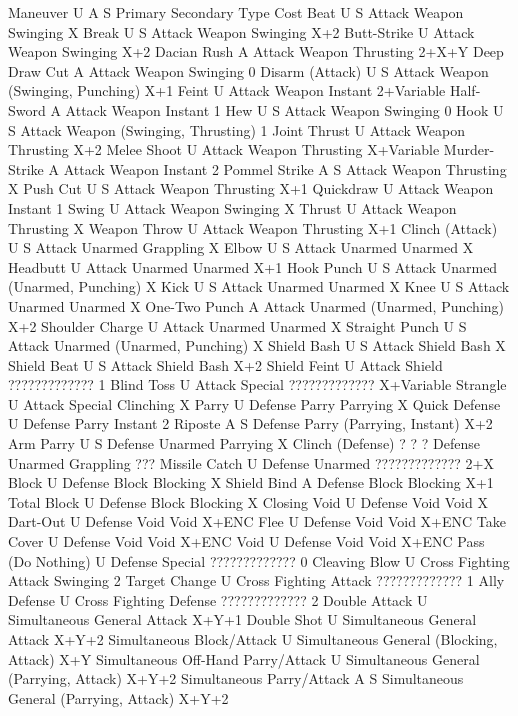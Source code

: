 \documentclass[oneside,11pt,english]{book}
\begin{document}
 

Maneuver U A S Primary Secondary Type Cost 
Beat U S Attack Weapon Swinging X 
Break U S Attack Weapon Swinging X+2 
Butt-Strike U Attack Weapon Swinging X+2 
Dacian Rush A Attack Weapon Thrusting 2+X+Y 
Deep Draw Cut A Attack Weapon Swinging 0 
Disarm (Attack) U S Attack Weapon (Swinging, Punching) X+1 
Feint U Attack Weapon Instant 2+Variable
Half-Sword A Attack Weapon Instant 1
Hew U S Attack Weapon Swinging 0 
Hook U S Attack Weapon (Swinging, Thrusting) 1
Joint Thrust U Attack Weapon Thrusting X+2
Melee Shoot U Attack Weapon Thrusting X+Variable
Murder-Strike A Attack Weapon Instant 2
Pommel Strike A S Attack Weapon Thrusting X 
Push Cut U S Attack Weapon Thrusting X+1 
Quickdraw U Attack Weapon Instant 1 
Swing U Attack Weapon Swinging X 
Thrust U Attack Weapon Thrusting X 
Weapon Throw U Attack Weapon Thrusting X+1 
Clinch (Attack) U S Attack Unarmed Grappling X 
Elbow U S Attack Unarmed Unarmed X 
Headbutt U Attack Unarmed Unarmed X+1 
Hook Punch U S Attack Unarmed (Unarmed, Punching) X
Kick U S Attack Unarmed Unarmed X 
Knee U S Attack Unarmed Unarmed X 
One-Two Punch A Attack Unarmed (Unarmed, Punching) X+2 
Shoulder Charge U Attack Unarmed Unarmed X 
Straight Punch U S Attack Unarmed (Unarmed, Punching) X
Shield Bash U S Attack Shield Bash X 
Shield Beat U S Attack Shield Bash X+2 
Shield Feint U Attack Shield ????????????? 1 
Blind Toss U Attack Special ????????????? X+Variable 
Strangle U Attack Special Clinching X 
Parry U Defense Parry Parrying X 
Quick Defense U Defense Parry Instant 2 
Riposte A S Defense Parry (Parrying, Instant) X+2 
Arm Parry U S Defense Unarmed Parrying X
Clinch (Defense) ? ? ? Defense Unarmed Grappling ???
Missile Catch U Defense Unarmed ????????????? 2+X 
Block U Defense Block Blocking X 
Shield Bind A Defense Block Blocking X+1 
Total Block U Defense Block Blocking X 
Closing Void U Defense Void Void X 
Dart-Out U Defense Void Void X+ENC 
Flee U Defense Void Void X+ENC 
Take Cover U Defense Void Void X+ENC 
Void U Defense Void Void X+ENC 
Pass (Do Nothing) U Defense Special ????????????? 0 
Cleaving Blow U Cross Fighting Attack Swinging 2 
Target Change U Cross Fighting Attack ????????????? 1 
Ally Defense U Cross Fighting Defense ????????????? 2 
Double Attack U Simultaneous General Attack X+Y+1 
Double Shot U Simultaneous General Attack X+Y+2 
Simultaneous Block/Attack U Simultaneous General (Blocking, Attack) X+Y 
Simultaneous Off-Hand Parry/Attack U Simultaneous General (Parrying, Attack) X+Y+2 
Simultaneous Parry/Attack A S Simultaneous General (Parrying, Attack) X+Y+2 
\end{document}
